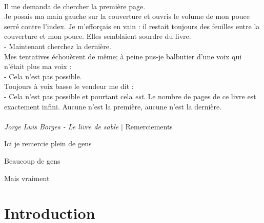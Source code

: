 \documentclass{tufte-book}
\begin{document}
\thispagestyle{empty}%
\clearpage%


\newpage

~\vfill
\noindent
\justify
\par\noindent Il me demanda de chercher la première page.\\
\noindent Je posais ma main gauche sur la couverture et ouvris le volume de mon pouce serré contre l'index. Je m'efforçais en vain : il restait toujours des feuilles entre la couverture et mon pouce. Elles semblaient sourdre du livre.\\
- Maintenant cherchez la dernière.\\
\noindent Mes tentatives échouèrent de même; à peine pus-je balbutier d'une voix qui n'était plus ma voix :\\
- Cela n'est pas possible.\\
\noindent Toujours à voix basse le vendeur me dit : \\
- Cela n'est pas possible et pourtant cela \textit{est}. Le nombre de pages de ce livre est exactement infini. Aucune n'est la première, aucune n'est la dernière.
\\~\\
\noindent\textit{Jorge Luis Borges - Le livre de sable} 
\vfill
\indent
\newpage
\begingroup
\vspace*{8em}
\huge $\vert$ \huge Remerciements
\vspace*{4em}
\par\normalsize Ici je remercie plein de gens

\par Beaucoup de gens

\par Mais vraiment
\endgroup
\vfill


\tableofcontents

\listoffigures

\listoftables

\mainmatter


\chapter{Introduction}
\end{document}
